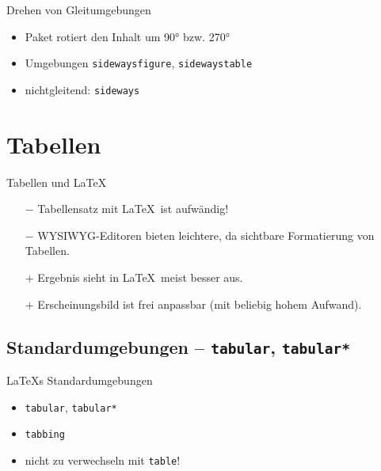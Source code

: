 \documentclass[
	vorläufig=false,
	datum=2022-11-09,
	titel={Gleitumgebungen und Tabellen},
	web=false,
	noshortverb=true,
	aspectratio=1610,
	max,
]{../tex/latexkurs-slides}
\begin{document}
\begin{frame}[fragile]{Drehen von Gleitumgebungen}
\begin{itemize}
\item Paket  rotiert den Inhalt um 90° bzw. 270°
\item Umgebungen \verb/sidewaysfigure/, \verb/sidewaystable/
\item nichtgleitend: \verb/sideways/
\end{itemize}
\begin{LTXexample}[width=.4\textwidth]
\centering
\begin{sideways}
[Bild]
\end{sideways}
\end{LTXexample}
\end{frame}


\section{Tabellen}
\begin{frame}{Tabellen und \LaTeX}
\begin{itemize}
\item[$\pmb-$] Tabellensatz mit \LaTeX\ ist aufwändig!
\item[$\pmb-$] WYSIWYG-Editoren bieten leichtere, da sichtbare Formatierung von Tabellen.
\item[$\pmb+$] Ergebnis sieht in \LaTeX\ meist besser aus.
\item[$\pmb+$] Erscheinungsbild ist frei anpassbar (mit beliebig hohem Aufwand).
\end{itemize}
\end{frame}

\subsection[tabular]{Standardumgebungen – \texttt{tabular}, \texttt{tabular*}}
\begin{frame}[fragile]{\LaTeX{}s Standardumgebungen}
\begin{itemize}
\item \verb/tabular/, \verb/tabular*/
\item \verb/tabbing/
\item \alert{nicht zu verwechseln mit \texttt{table}!}
\end{itemize}
\end{frame}
\end{document}
